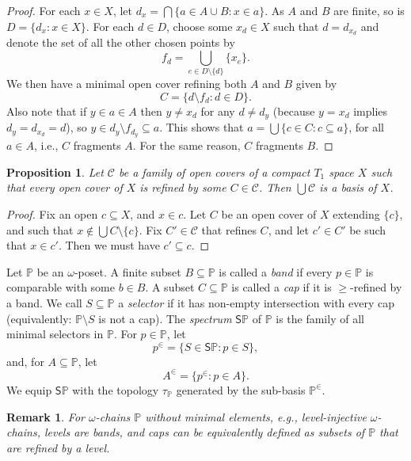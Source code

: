 \documentclass[12pt]{amsart}
\theoremstyle{plain}
\newtheorem{remark}[theorem]{\bf Remark}
\newtheorem{proposition}[theorem]{\bf Proposition}
\newcommand \Sp{{\mathsf{S}}}
\newcommand \PPb{\mathbb{P}}
\begin{document}
\begin{proof}
	For each $x \in X$, let $d_x = \bigcap \{a \in  A \cup B : x \in  a\}$. As $A$ and $B$ are finite, so is $D= \{d_x : x \in  X\}$. For each $d \in  D$, choose some $x_d \in X$ such that $d= d_{x_d}$ and denote the set of all the other chosen points by $$f_d = \bigcup_{e \in D \setminus \{d\}} \{x_e\}.$$ We then have a minimal open cover refining both $A$ and $B$ given by $$C= \{d \setminus  f_d : d \in D\}.$$ Also note that if $y \in  a \in A$ then $y  \neq  x_d$ for any $d \neq d_y$ (because $y= x_d$ implies $d_y = d_{x_d}
	= d$), so $y \in d_y \setminus f_{d_y} \subseteq  a$. This shows that $a= 
	\bigcup \{c \in C: c \subseteq a\}$, for all $a \in A$, i.e., $C$ fragments $A$. For the same reason, $C$ fragments $B$.  
\end{proof}

\begin{proposition}
	\label{pr:SeqGivesBasis}
	Let $\mathcal{C}$ be a family of open covers of a  compact $T_1$ space $X$ such that every open cover of $X$ is refined by some $C \in \mathcal{C}$. Then $\bigcup \mathcal{C}$ is a basis of $X$.
\end{proposition}

\begin{proof}
	Fix an open $c \subseteq X$, and $x \in c$. Let $C$ be an open cover of $X$ extending $\{c\}$, and such that $x \not \in \bigcup C \setminus \{c\}$. Fix $C' \in \mathcal{C}$ that refines $C$, and let $c' \in C'$ be such that $x \in c'$. Then we must have $c' \subseteq c$. 	
\end{proof}

Let $\PPb$ be an $\omega$-poset. A finite subset $B \subseteq \PPb$ is called a \emph{band} if every $p \in \PPb$ is comparable with some $b \in B$.  A subset $C \subseteq \PPb$ is called a \emph{cap} if it is  $\geq$-refined by a band. %
We call $S \subseteq \PPb$ a \emph{selector} if it has non-empty intersection with every cap (equivalently: $\PPb \setminus S$ is not a cap).  The \emph{spectrum} $\Sp \PPb$ of $\PPb$ is the family of all minimal selectors in $\PPb$. For $p \in \PPb$, let $$p^\in=\{S \in \Sp \PPb: p \in S \},$$ and, for $A \subseteq \PPb$, let $$A^\in=\{p^\in: p \in A \}.$$ We equip $\Sp \PPb$ with the topology $\tau_\PPb$ generated by the sub-basis $\PPb^\in$. 


\begin{remark}
\label{re:LevelsEnough}
For $\omega$-chains $\PPb$ without minimal elements, e.g., level-injective $\omega$-chains, levels are bands, and caps can be equivalently defined as subsets of $\PPb$ that are refined by a level.
\end{remark}
\end{document}
